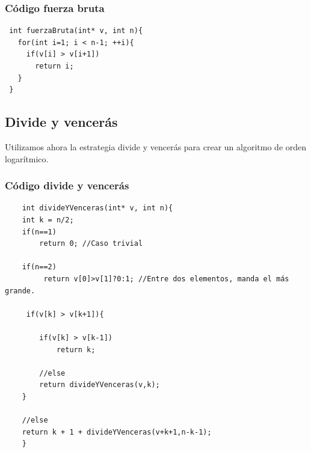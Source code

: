 \documentclass[compress]{beamer}
\begin{document}
\begin{frame}[fragile]
	\frametitle{Código fuerza bruta}
 \begin{lstlisting}
 int fuerzaBruta(int* v, int n){
   for(int i=1; i < n-1; ++i){
     if(v[i] > v[i+1])
       return i;
   }
 }
 \end{lstlisting}
\end{frame}

\subsection{Divide y vencerás}
\begin{frame}
        Utilizamos ahora la estrategia divide y vencerás para crear un algoritmo
de orden logarítmico.\\

\end{frame}
\newlength\someheight
\setlength\someheight{3.5cm}

\begin{frame}[fragile]
\frametitle{Código divide y vencerás}
\begin{center}
 \begin{adjustbox}{width=\textwidth,height=\someheight,keepaspectratio}
 	\begin{lstlisting}
 	int divideYVenceras(int* v, int n){
 	int k = n/2;
 	if(n==1)
	 	return 0; //Caso trivial
 	
 	if(n==2)
	 	 return v[0]>v[1]?0:1; //Entre dos elementos, manda el más grande.
 	
	 if(v[k] > v[k+1]){

 		if(v[k] > v[k-1]) 
	 		return k;
 		
	 	//else
 		return divideYVenceras(v,k);
 	}
 		
 	//else
 	return k + 1 + divideYVenceras(v+k+1,n-k-1);
 	}
 		\end{lstlisting}
 		\end{adjustbox}
 		\end{center}
 		
\end{frame}
\end{document}
